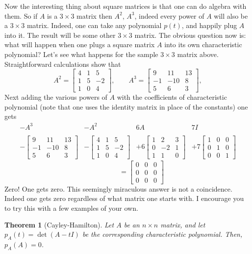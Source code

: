 \documentclass[12pt]{article}
\newcommand{\lb}{\left[}
\newcommand{\rb}{\right]}
\newtheorem{theorem}{Theorem}
\begin{document}
 Now the interesting thing about square matrices is that one can do
 algebra with them.  So if $A$ is a $3\times3$ matrix then $A^2$,
 $A^3$, indeed every power of $A$ will also be a $3\times 3$ matrix.
 Indeed, one can take any polynomial $p(t)$, and happily plug $A$ into
 it.  The result will be some other $3\times 3$ matrix.  The obvious
 question now is: what will happen when one plugs a square matrix $A$
 into its own characteristic polynomial?  Let's see what happens for
 the sample $3\times 3$ matrix above. Straightforward calculations show
 that
 $$
 A^2=
 \lb\begin{array}{rrr}
  4&  1 &  5 \\
  1&  5 & -2 \\
  1&  0 &  4 
 \end{array}\rb,\qquad
 A^3=
 \lb\begin{array}{rrr}
  9&   11&  13\\
 -1&  -10&   8\\
  5&   6 &   3
 \end{array}\rb,
 $$
 Next adding the various powers of $A$ with the coefficients of
 characteristic polynomial (note that one uses the identity matrix in
 place of the constants) one gets
 {\small
 $$
 \begin{array}{cccc}
 -A^3 & -A^2 & 6A & 7I \\
 \\
 -
 \lb\begin{array}{rrr}
  9&   11&  13\\
 -1&  -10&   8\\
  5&   6 &   3
 \end{array}\rb 
 & -
 \lb\begin{array}{rrr}
  4&  1 &  5 \\
  1&  5 & -2 \\
  1&  0 &  4 
 \end{array}\rb 
 &
 + 6
 \lb\begin{array}{rrr}
 1 &  2 & 3 \\
 0 & -2 & 1 \\
 1 &  1 & 0 
 \end{array}\rb
 &
 + 7
 \lb\begin{array}{rrr}
  1 & 0 & 0 \\
  0 & 1 & 0 \\
  0 & 0 & 1 
 \end{array}\rb 
 \end{array}
 $$
 $$
 \qquad \qquad = 
 \lb\begin{array}{rrr}
  0 & 0 & 0 \\
  0 & 0 & 0 \\
  0 & 0 & 0 
 \end{array}\rb 
 $$
 }
 Zero!  One gets zero.  This seemingly miraculous answer is not a
 coincidence. Indeed one gets zero regardless of what matrix one
 starts with.  I encourage you to try this with a few examples of your own.
 \begin{theorem}[Cayley-Hamilton]
 Let $A$ be an $n\times n$ matrix, and let $p_A(t)=\det(A-tI)$ be the
 corresponding characteristic polynomial.  Then,  $p_A(A)=0$.
 \end{theorem}
\end{document}
